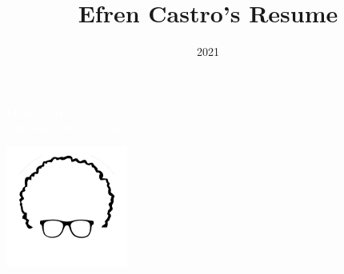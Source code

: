 \documentclass[10pt,oneside,a4paper,titlepage]{article}
\title{Efren Castro's Resume}
\date{2021}
\begin{document}

\begin{tcolorbox}
  \begin{minipage}{15cm}
    \huge{\textcolor{white}{Efren Castro}}\\
    \large{\textcolor{white}{Full Stack Web Developer}}
  \end{minipage}
  \begin{minipage}{4.5cm}
    \includegraphics[width=4cm,trim=-3cm 5cm 3cm 0]{Logo.png}
  \end{minipage}
\end{tcolorbox}
\end{document}
